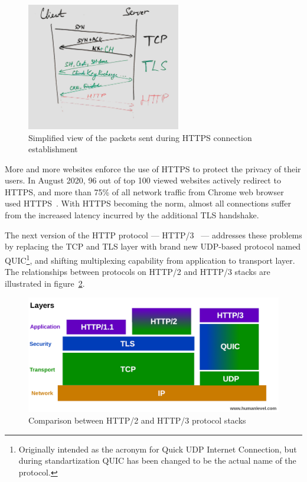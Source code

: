 \begin{figure}[h]
  \centering
  \includegraphics[width=0.6\textwidth]{img/01-https-connection-packets}
  \caption{Simplified view of the packets sent during HTTPS connection establishment}\label{fig:https-packets}
\end{figure}

More and more websites enforce the use of HTTPS to protect the privacy of their users. In August
2020, 96 out of top 100 viewed websites actively redirect to HTTPS, and more than 75\% of all
network traffic from Chrome web browser used HTTPS~\cite{googleTransparency}. With HTTPS becoming the
norm, almost all connections suffer from the increased latency incurred by the additional TLS handshake.

The next version of the HTTP protocol --- HTTP/3~\cite{draft-ietf-quic-http-29} --- addresses these
problems by replacing the TCP and TLS layer with brand new UDP-based protocol named
QUIC\footnote{Originally intended as the acronym for Quick UDP Internet Connection, but during
standartization QUIC has been changed to be the actual name of the protocol.}, and shifting
multiplexing capability from application to transport layer. The relationships between protocols on
HTTP/2 and HTTP/3 stacks are illustrated in figure~\ref{fig:http2-vs-http3-stack}.

\begin{figure}[h]
  \centering
  \includegraphics[width=\textwidth]{img/01-pile-http-protocol}
  \caption{Comparison between HTTP/2 and HTTP/3 protocol stacks}\label{fig:http2-vs-http3-stack}
\end{figure}

